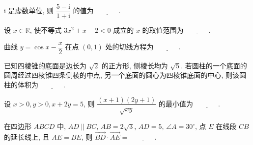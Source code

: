 \begin{question}
$\mathrm{i}$ 是虚数单位, 则 $\dfrac{5 - \mathrm{i}}{1 + \mathrm{i}}$ 的值为 $\underline{\phantom{XXXX}}$.

\end{question}
\begin{question}
设 $x \in \mathbb{R}$, 使不等式 $3x^2 + x - 2 < 0$ 成立的 $x$ 的取值范围为 $\underline{\phantom{XXXX}}$.

\end{question}
\begin{question}
曲线 $y = \cos x - \dfrac{x}{2}$ 在点 $(0, 1)$ 处的切线方程为 $\underline{\phantom{XXXX}}$.

\end{question}
\begin{question}
已知四棱锥的底面是边长为 $\sqrt{2}$ 的正方形, 侧棱长均为 $\sqrt{5}$. 若圆柱的一个底面的圆周经过四棱锥四条侧棱的中点, 另一个底面的圆心为四棱锥底面的中心, 则该圆柱的体积为 $\underline{\phantom{XXXX}}$.

\end{question}
\begin{question}
设 $x > 0, y > 0, x + 2y = 5$, 则 $\dfrac{(x + 1)(2y + 1)}{\sqrt{xy}}$ 的最小值为 $\underline{\phantom{XXXX}}$.

\end{question}
\begin{question}
在四边形 $ABCD$ 中, $AD \parallel BC$, $AB = 2\sqrt{3}$, $AD = 5$, $\angle A = 30^\circ$, 点 $E$ 在线段 $CB$ 的延长线上, 且 $AE = BE$, 则 $\vec{BD} \cdot \vec{AE} =$ $\underline{\phantom{XXXX}}$.

\par\medskip

\end{question}

